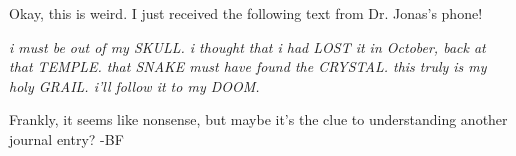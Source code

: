 Okay, this is weird. I just received the following text from Dr. Jonas's phone!

\textit{i must be out of my SKULL. i thought that i had LOST it in October,
back at that TEMPLE. that SNAKE must have found the CRYSTAL. this truly
is my holy GRAIL. i'll follow it to my DOOM.}

Frankly, it seems like nonsense, but maybe it's the clue to understanding another
journal entry? -BF
